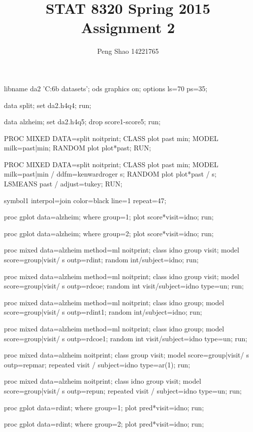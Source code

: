 \documentclass[letterpaper, 12pt]{article}
\begin{document}
\title{STAT 8320 Spring 2015 Assignment 2}
\author{Peng Shao 14221765}
\maketitle
\indent



\begin{Sascode}[store=class]
libname da2 'C:\Users\psy6b\Desktop{} datasets';
ods graphics on;
options ls=70 ps=35;

data split;
set da2.h4q4;
run;

data alzheim;
set da2.h4q5;
drop score1-score5;
run;

PROC MIXED DATA=split noitprint;
CLASS plot past min;
MODEL milk=past|min;
RANDOM plot plot*past;
RUN;

PROC MIXED DATA=split noitprint;
CLASS plot past min;
MODEL milk=past|min / ddfm=kenwardroger s;
RANDOM plot plot*past / s;
LSMEANS past / adjust=tukey;
RUN;

symbol1 interpol=join color=black line=1 repeat=47;

proc gplot data=alzheim;
where group=1;
plot score*visit=idno;
run;

proc gplot data=alzheim;
where group=2;
plot score*visit=idno;
run;

proc mixed data=alzheim method=ml noitprint;
class idno group visit;
model score=group|visit/ s outp=rdint;
random int/subject=idno;
run;

proc mixed data=alzheim method=ml noitprint;
class idno group visit;
model score=group|visit/ s outp=rdcoe;
random int visit/subject=idno type=un;
run;

proc mixed data=alzheim method=ml noitprint;
class idno group;
model score=group|visit/ s outp=rdint1;
random int/subject=idno;
run;

proc mixed data=alzheim method=ml noitprint;
class idno group;
model score=group|visit/ s outp=rdcoe1;
random int visit/subject=idno type=un;
run;

proc mixed data=alzheim noitprint;
class group visit;
model score=group|visit/ s outp=repmar;
repeated visit / subject=idno type=ar(1);
run;

proc mixed data=alzheim noitprint;
class idno group visit;
model score=group|visit/ s outp=repun;
repeated visit / subject=idno type=un;
run;

proc gplot data=rdint;
where group=1;
plot pred*visit=idno;
run;

proc gplot data=rdint;
where group=2;
plot pred*visit=idno;
run;


\end{Sascode}
\end{document}
